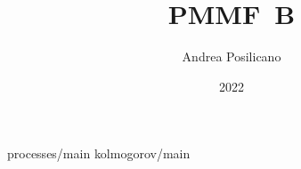 \usepackage	{PMMF-style/style}

\title	{PMMF~B}
\author	{Andrea Posilicano}
\date	{2022}


\maketitle
	{processes/main}
\appendix
	{kolmogorov/main}

